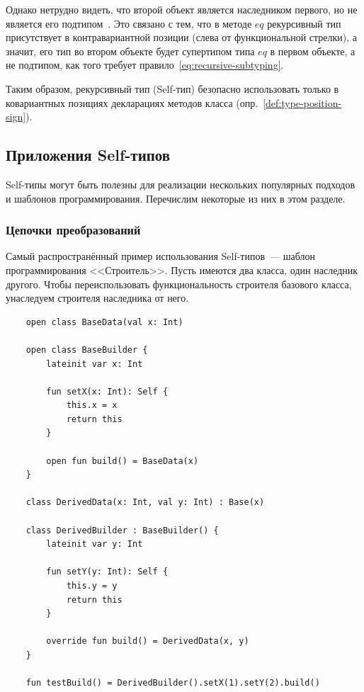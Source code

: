 Однако нетрудно видеть, что второй объект является наследником первого, но не является его подтипом~\cite{cook1989inheritance}.
Это связано с тем, что в методе $eq$ рекурсивный тип присутствует в контравариантной позиции (слева от функциональной стрелки), а значит, его тип во втором объекте будет супертипом типа $eq$ в первом объекте, а не подтипом, как того требует правило~\eqref{eq:recursive-subtyping}.

Таким образом, рекурсивный тип (Self-тип) безопасно использовать только в ковариантных позициях декларациях методов класса (опр.~\ref{def:type-position-sign}).


\subsection{Приложения Self-типов}\label{subsec:applications}

Self-типы могут быть полезны для реализации нескольких популярных подходов и шаблонов программирования.
Перечислим некоторые из них в этом разделе.

\subsubsection{Цепочки преобразований}

Самый распространённый пример использования Self-типов~--- шаблон программирования <<Строитель>>.
Пусть имеются два класса, один наследник другого.
Чтобы переиспользовать функциональность строителя базового класса, унаследуем строителя наследника от него.

\begin{verbatim}
    open class BaseData(val x: Int)

    open class BaseBuilder {
        lateinit var x: Int

        fun setX(x: Int): Self {
            this.x = x
            return this
        }

        open fun build() = BaseData(x)
    }

    class DerivedData(x: Int, val y: Int) : Base(x)

    class DerivedBuilder : BaseBuilder() {
        lateinit var y: Int

        fun setY(y: Int): Self {
            this.y = y
            return this
        }

        override fun build() = DerivedData(x, y)
    }

    fun testBuild() = DerivedBuilder().setX(1).setY(2).build()
\end{verbatim}

